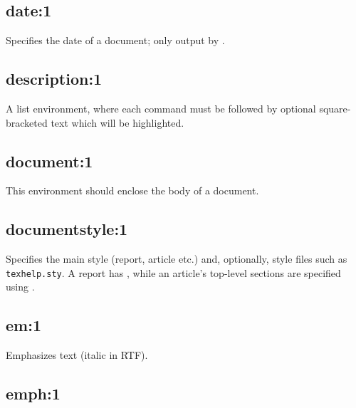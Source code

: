 \subsection*{date:1}\label{date}

Specifies the date of a document; only output by .

\subsection*{description:1}\label{description}

A list environment, where each  command must be
followed by optional square-bracketed text which will be highlighted.


\subsection*{document:1}\label{document}

This environment should enclose the body of a document.

\subsection*{documentstyle:1}\label{documentstyle}

Specifies the main style (report, article etc.) and, optionally, style files
such as {\tt texhelp.sty}. A report has , while an article's top-level
sections are specified using .

\subsection*{em:1}\label{em}

Emphasizes text (italic in RTF).

\subsection*{emph:1}\label{emph}

